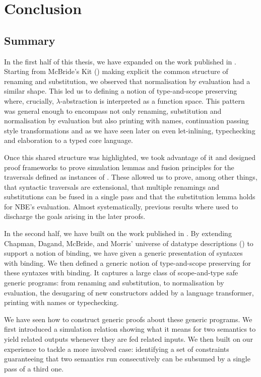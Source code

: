 \chapter{Conclusion}

\section{Summary}

In the first half of this thesis, we have expanded on the work published in
\cite{allais2017type}. Starting from McBride's Kit (\citeyear{mcbride2005type})
making explicit the common structure of renaming and substitution, we observed
that normalisation by evaluation had a similar shape. This led us to
defining a notion of type-and-scope preserving  where, crucially,
$\lambda$-abstraction is interpreted as a  function space. This
pattern was general enough to encompass not only renaming, substitution and
normalisation by evaluation but also printing with names, continuation passing
style transformations and as we have seen later on even let-inlining, typechecking
and elaboration to a typed core language.

Once this shared structure was highlighted, we took advantage of it and designed
proof frameworks to prove simulation lemmas and fusion principles for the traversals
defined as instances of . These allowed us to prove, among other
things, that syntactic traversals are extensional, that multiple renamings and
substitutions can be fused in a single pass and that the substitution lemma holds
for NBE's evaluation. Almost systematically, previous results where used to discharge
the goals arising in the later proofs.

In the second half, we have built on the work published in \cite{generic-syntax}.
By extending Chapman, Dagand, McBride, and Morris' universe of datatype descriptions
(\citeyear{Chapman:2010:GAL:1863543.1863547}) to support a notion of binding,
we have given a generic presentation of syntaxes with binding. We then defined a
generic notion of type-and-scope preserving  for these syntaxes with
binding. It captures a large class of scope-and-type safe generic programs: from
renaming and substitution, to normalisation by evaluation, the desugaring of new
constructors added by a language transformer, printing with names or typechecking.

We have seen how to construct generic proofs about these generic programs. We
first introduced a simulation relation showing what it means for two semantics
to yield related outputs whenever they are fed related inputs. We then built on
our experience to tackle a more involved case: identifying a set of constraints
guaranteeing that two semantics run consecutively can be subsumed by a single pass
of a third one.

